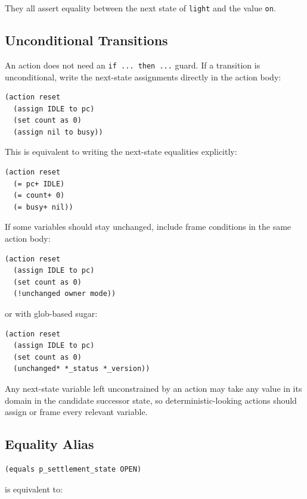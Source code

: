 \documentclass[11pt]{article}
\begin{document}
They all assert equality between the next state of \texttt{light} and the value
\texttt{on}.

\subsection{Unconditional Transitions}

An action does not need an \texttt{if ... then ...} guard.  If a transition is
unconditional, write the next-state assignments directly in the action body:

\begin{lstlisting}[language=DSTR]
(action reset
  (assign IDLE to pc)
  (set count as 0)
  (assign nil to busy))
\end{lstlisting}

This is equivalent to writing the next-state equalities explicitly:

\begin{lstlisting}[language=DSTR]
(action reset
  (= pc+ IDLE)
  (= count+ 0)
  (= busy+ nil))
\end{lstlisting}

If some variables should stay unchanged, include frame conditions in the same
action body:

\begin{lstlisting}[language=DSTR]
(action reset
  (assign IDLE to pc)
  (set count as 0)
  (!unchanged owner mode))
\end{lstlisting}

or with glob-based sugar:

\begin{lstlisting}[language=DSTR]
(action reset
  (assign IDLE to pc)
  (set count as 0)
  (unchanged* *_status *_version))
\end{lstlisting}

Any next-state variable left unconstrained by an action may take any value in
its domain in the candidate successor state, so deterministic-looking actions
should assign or frame every relevant variable.

\subsection{Equality Alias}

\begin{lstlisting}[language=DSTR]
(equals p_settlement_state OPEN)
\end{lstlisting}

is equivalent to:
\end{document}
